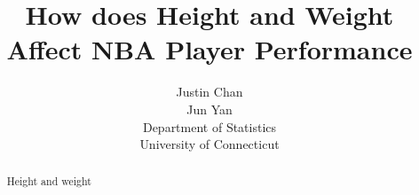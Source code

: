 \documentclass[12pt]{article}
\title{How does Height and Weight Affect NBA Player Performance}
\author{Justin Chan\\
	Jun Yan\\[2ex]
	Department of Statistics\\
	University of Connecticut\\
}
\begin{document}
\maketitle
\doublespace

\begin{abstract}
Height and weight

\end{abstract}
\end{document}
